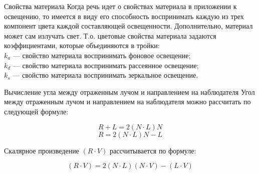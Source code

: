 \documentclass{beamer}
\begin{document}
	\begin{frame}{Свойства материала}
		Когда речь идет о свойствах материала в приложении к освещению, то имеется в виду его способность воспринимать каждую из трех компонент цвета каждой составляющей освещенности. Дополнительно, материал может сам излучать свет. Т.о. цветовые свойства материала задаются коэффициентами, которые объединяются в тройки: \\
		$k_a$ --- свойство материала воспринимать фоновое освещение; \\
		$k_d$ --- свойство материала воспринимать рассеянное освещение; \\
		$k_s$ --- свойство материала воспринимать зеркальное освещение.
		
	\end{frame}




	\begin{frame}{Вычисление угла между отраженным лучом и направлением на наблюдателя}
		Угол между отраженным лучом и направлением на наблюдателя можно рассчитать по следующей формуле:

		\[
			R + L=2(N \cdot L) N	
		\]
		\[
			R = 2 (N \cdot L) N - L
		\]

		Скалярное произведение $(R \cdot V)$ рассчитывается по формуле:

		\[
			(R \cdot V) =2({N}\cdot{L})({N}\cdot{V})-({L}\cdot{V})
		\]


	\end{frame}
\end{document}
